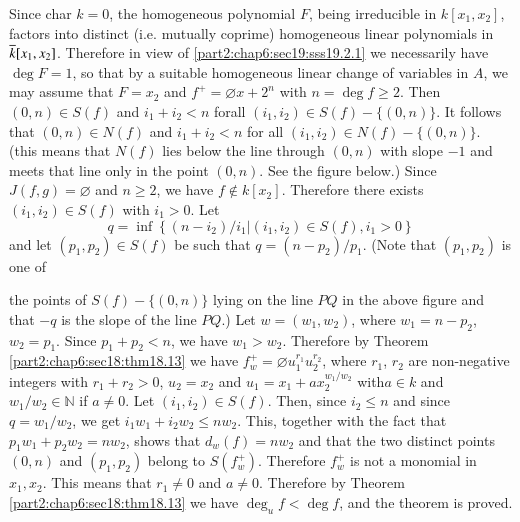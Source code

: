 Since char $k=0$, the homogeneous polynomial $F$, being irreducible in
$k[x_1, x_2]$, factors into distinct (i.e. mutually coprime)
homogeneous linear polynomials in $\overline{k}[x_1, x_2]$. Therefore in
view of  \ref{part2:chap6:sec19:sss19.2.1}  we necessarily have $\deg
F=1$, so that by a suitable homogeneous linear change of variables in
$A$, we may assume that $F= x_2$ and $f^+ = \diameter x+2^n$ with $n =
\deg f \geq 2$. Then $(0, n) \in S(f)$ and $i_1 + i_2 < n$
for\pageoriginale all $(i_1, i_2)\in S(f)- \{ (0, n)\}$. It follows
that $(0, n) \in N(f)$ and $i_1 + i_2 < n$ for all $(i_1, i_2) \in
N(f)- \{ (0, n) \}$. (this means that $N(f)$ lies below the line
through $(0, n)$ with slope $-1$ and meets that line only in the point
$(0, n)$. See the figure below.) Since $J(f, g)= \diameter$ and $n
\geq 2$, we have $f \notin k[x_2]$. Therefore there exists $(i_1, i_2)
\in S(f)$ with $i_1 > 0$. Let
$$
q= \inf \left\{ (n-i_2) /i_1 \Big| (i_1, i_2) \in S(f), i_1 > 0\right\}
$$
and let $(p_1, p_2)\in S(f)$ be such that $q= (n-p_2)/p_1$. (Note that
$(p_1, p_2)$ is one of 
\begin{figure}[H]
\end{figure}
the points of $S(f)- \{ (0, n)\}$ lying on the line $PQ$ in the above
figure and that $-q$ is the slope of the line $PQ$.) Let $w= (w_1,
w_2)$, where $w_1 = n- p_2$, $w_2=p_1$. Since $p_1+ p_2< n$, we have
$w_1> w_2$. Therefore by Theorem \ref{part2:chap6:sec18:thm18.13} we
have $f^+_w = \diameter u_1^{r_1}u_2^{r_2}$, where $r_1$, $r_2$ are
non-negative integers with $r_1+ r_2 > 0$, $u_2 = x_2$ and $u_1 =
x_1+ax_2^{w_1/w_2}$ with\pageoriginale $a\in k$ and $w_1/w_2 \in
\mathbb{N}$ if $a \neq 0$. Let $(i_1, i_2)\in S(f)$. Then, since $i_2
\leq n$ and since $q=w_1/w_2$, we get $i_1 w_1 + i_2 w_2\leq
nw_2$. This, together with the fact that $p_1 w_1 + p_2 w_2= nw_2$,
shows that $d_w(f)= nw_2$ and that the two distinct points $(0, n)$
and $(p_1, p_2)$ belong to $S(f^+_w)$. Therefore $f^+_w$ is not a
monomial in $x_1, x_2$. This means that $r_1 \neq 0$ and $a \neq
0$. Therefore by Theorem \ref{part2:chap6:sec18:thm18.13} we have
$\deg_u f < \deg f$, and the theorem is proved.

